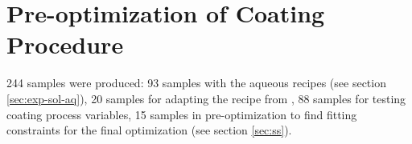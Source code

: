\section{Pre-optimization of Coating Procedure}
\label{sec:exp-preopt}
244 samples were produced: 93 samples with the aqueous recipes (see section \ref{sec:exp-sol-aq}), 20 samples for adapting the recipe from \cite{Hu2016}, 88 samples for testing coating process variables, 15 samples in pre-optimization to find fitting constraints for the final optimization (see section \ref{sec:ss}). 

